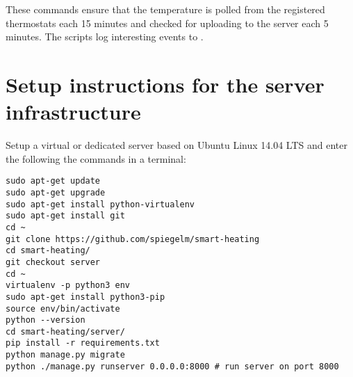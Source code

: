 These commands ensure that the temperature is polled from the registered
thermostats each 15 minutes and checked for uploading to the server each
5 minutes. The scripts log interesting events to
.


\section{Setup instructions for the server infrastructure}

Setup a virtual or dedicated server based on Ubuntu Linux 14.04 LTS and enter the following the commands in a terminal:

\noindent
\begin{minipage}{\linewidth}
	\begin{lstlisting}
sudo apt-get update
sudo apt-get upgrade
sudo apt-get install python-virtualenv
sudo apt-get install git
cd ~
git clone https://github.com/spiegelm/smart-heating
cd smart-heating/
git checkout server
cd ~
virtualenv -p python3 env
sudo apt-get install python3-pip
source env/bin/activate
python --version
cd smart-heating/server/
pip install -r requirements.txt
python manage.py migrate
python ./manage.py runserver 0.0.0.0:8000 # run server on port 8000
	\end{lstlisting}
\end{minipage}

